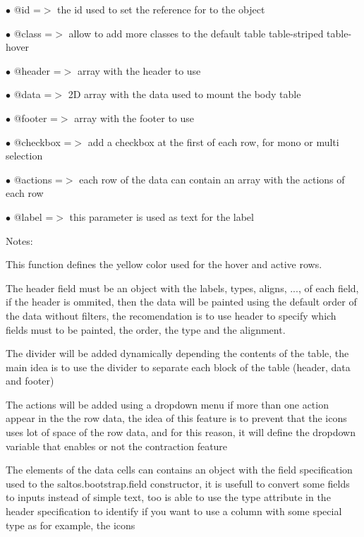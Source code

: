 \documentclass[a4paper]{book}
\begin{document}
\begin{compactitem}
\item[\color{myblue}$\bullet$] @id       =$>$ the id used to set the reference for to the object
\item[\color{myblue}$\bullet$] @class    =$>$ allow to add more classes to the default table table-striped table-hover
\item[\color{myblue}$\bullet$] @header   =$>$ array with the header to use
\item[\color{myblue}$\bullet$] @data     =$>$ 2D array with the data used to mount the body table
\item[\color{myblue}$\bullet$] @footer   =$>$ array with the footer to use
\item[\color{myblue}$\bullet$] @checkbox =$>$ add a checkbox at the first of each row, for mono or multi selection
\item[\color{myblue}$\bullet$] @actions  =$>$ each row of the data can contain an array with the actions of each row
\item[\color{myblue}$\bullet$] @label    =$>$ this parameter is used as text for the label
\end{compactitem}

Notes:

This function defines the yellow color used for the hover and active rows.

The header field must be an object with the labels, types, aligns, ..., of each field,
if the header is ommited, then the data will be painted using the default order of the
data without filters, the recomendation is to use header to specify which fields must
to be painted, the order, the type and the alignment.

The divider will be added dynamically depending the contents of the table, the main idea
is to use the divider to separate each block of the table (header, data and footer)

The actions will be added using a dropdown menu if more than one action appear in the
the row data, the idea of this feature is to prevent that the icons uses lot of space
of the row data, and for this reason, it will define the dropdown variable that enables
or not the contraction feature

The elements of the data cells can contains an object with the field specification used
to the saltos.bootstrap.field constructor, it is usefull to convert some fields to inputs
instead of simple text, too is able to use the type attribute in the header specification
to identify if you want to use a column with some special type as for example, the icons
\end{document}
